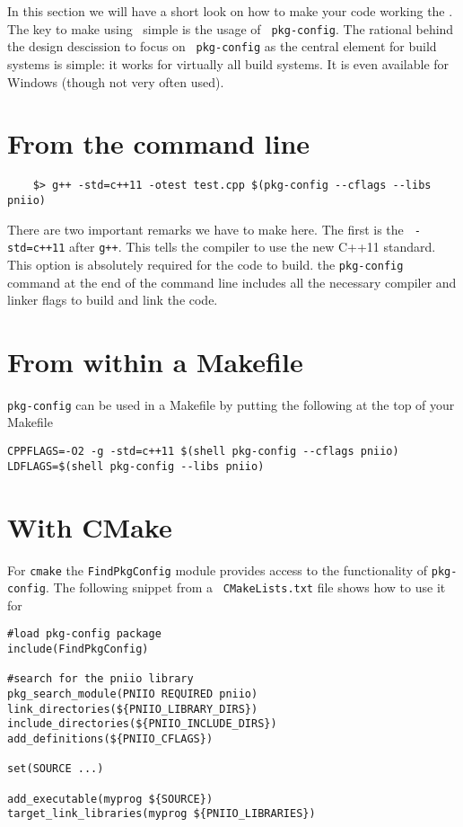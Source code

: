 
In this section we will have a short look on how to make your code working the
\libpniio. The key to make using \libpniio\ simple is the usage of {\tt
pkg-config}. The rational behind the design descission to focus on {\tt
pkg-config} as the central element for build systems is simple: it works for
virtually all build systems. It is even available for Windows (though not very
often used). 

\section{From the command line}

\begin{verbatim}
    $> g++ -std=c++11 -otest test.cpp $(pkg-config --cflags --libs pniio)
\end{verbatim}
There are two important remarks we have to make here. The first is the {\tt
-std=c++11} after {\tt g++}. This tells the compiler to use the new C++11
standard. This option is absolutely required for the code to build. 
the {\tt pkg-config} command at the end of the command line includes all the
necessary compiler and linker flags to build and link the code.

\section{From within a Makefile}

{\tt pkg-config} can be used in a Makefile by putting the following at the top
of your Makefile
\begin{verbatim}
CPPFLAGS=-O2 -g -std=c++11 $(shell pkg-config --cflags pniio)
LDFLAGS=$(shell pkg-config --libs pniio)
\end{verbatim}

\section{With CMake}

For {\tt cmake} the {\tt FindPkgConfig} module provides access to the
functionality of {\tt pkg-config}. The following snippet from a {\tt
CMakeLists.txt} file shows how to use it for \libpniio
\begin{verbatim}
#load pkg-config package
include(FindPkgConfig)

#search for the pniio library 
pkg_search_module(PNIIO REQUIRED pniio)
link_directories(${PNIIO_LIBRARY_DIRS})
include_directories(${PNIIO_INCLUDE_DIRS})
add_definitions(${PNIIO_CFLAGS})

set(SOURCE ...)

add_executable(myprog ${SOURCE})
target_link_libraries(myprog ${PNIIO_LIBRARIES})
\end{verbatim}

